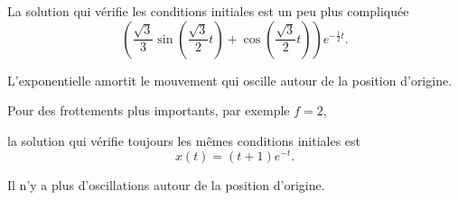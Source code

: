 \change 
La solution qui vérifie les conditions initiales est un peu plus compliquée
  $$\left(\frac{\sqrt{3}}{3} \sin\left(\frac{\sqrt{3}}{2} t\right) + 
   \cos\left(\frac{\sqrt{3}}{2} t\right)\right)
  e^{-\frac{1}{2} t}. $$

\change  
  L'exponentielle amortit le mouvement qui oscille autour de la position d'origine.
  
\change 
Pour des frottements plus importants, par exemple $f=2$,

\change 
la solution qui vérifie toujours les mêmes conditions initiales est 
  $$x(t) = (t + 1)e^{-t}.$$
  
\change 
  Il n'y a plus d'oscillations autour de la position d'origine.




